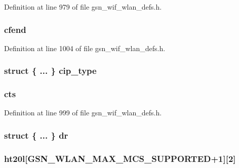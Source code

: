 Definition at line 979 of file gsn\_\-wif\_\-wlan\_\-defs.h.

\hypertarget{a00398_a2c06c8066fcb99662805ee710e802e94}{
\subsubsection[{cfend}]{ {\bf cfend}}}
\label{a00398_a2c06c8066fcb99662805ee710e802e94}


Definition at line 1004 of file gsn\_\-wif\_\-wlan\_\-defs.h.

\hypertarget{a00398_ac9c7a95577c727976f0a0ebc08925345}{
\subsubsection[{cip\_\-type}]{\setlength{\rightskip}{0pt plus 5cm}struct \{ ... \}   {\bf cip\_\-type}}}
\label{a00398_ac9c7a95577c727976f0a0ebc08925345}
\hypertarget{a00398_a076083e8814c4eed94595411f6ff467d}{
\subsubsection[{cts}]{ {\bf cts}}}
\label{a00398_a076083e8814c4eed94595411f6ff467d}


Definition at line 999 of file gsn\_\-wif\_\-wlan\_\-defs.h.

\hypertarget{a00398_a1c685d934469a9c13b39da01ecc7813a}{
\subsubsection[{dr}]{\setlength{\rightskip}{0pt plus 5cm}struct \{ ... \}   {\bf dr}}}
\label{a00398_a1c685d934469a9c13b39da01ecc7813a}
\hypertarget{a00398_a5512e7cbb968332fffc963132021c2a9}{
\subsubsection[{ht20l}]{ {\bf ht20l}\mbox{[}GSN\_\-WLAN\_\-MAX\_\-MCS\_\-SUPPORTED+1\mbox{]}\mbox{[}2\mbox{]}}}
\label{a00398_a5512e7cbb968332fffc963132021c2a9}


